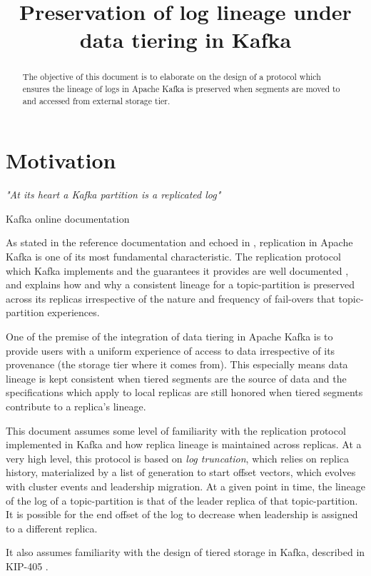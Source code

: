 \documentclass{article}
\title{Preservation of log lineage under data tiering in Kafka}
\begin{document}
\maketitle \thispagestyle{fancy2}
\begin{abstract}
	The objective of this document is to elaborate on the design of a protocol which ensures the lineage of logs in Apache Kafka is preserved  when segments are moved to and accessed from external storage tier.
\end{abstract}

\section{Motivation}
\epigraph{\textit{"At its heart a Kafka partition is a replicated log"}}{Kafka online documentation \cite{RD1}}

As stated in the reference documentation and echoed in \cite{KDG}, replication in Apache Kafka is one of its most fundamental characteristic. The replication protocol which Kafka implements and the guarantees it provides are well documented \cite{KIP101} \cite{KIP279}, and explains how and why a consistent lineage for a topic-partition is preserved across its replicas irrespective of the nature and frequency of fail-overs that topic-partition experiences. 

One of the premise of the integration of data tiering in Apache Kafka is to provide users with a uniform experience of access to data irrespective of its provenance (the storage tier where it comes from). This especially means data lineage is kept consistent when tiered segments are the source of data and the specifications which apply to local replicas are still honored when tiered segments contribute to a replica's lineage.

This document assumes some level of familiarity with the replication protocol implemented in Kafka and how replica lineage is maintained across replicas. At a very high level, this protocol is based on \textit{log truncation}, which relies on replica history, materialized by a list of generation to start offset vectors, which evolves with cluster events and leadership migration. At a given point in time, the lineage of the log of a topic-partition is that of the leader replica of that topic-partition. It is possible for the end offset of the log to decrease when leadership is assigned to a different replica.

It also assumes familiarity with the design of tiered storage in Kafka, described in KIP-405 \cite{KIP405}.
\end{document}
